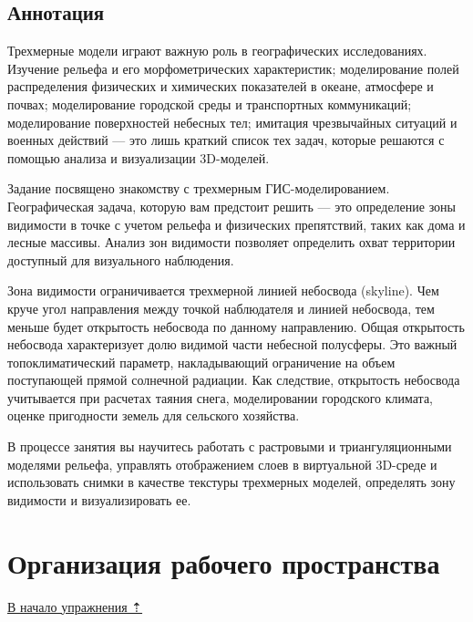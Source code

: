 \documentclass[]{book}
\theoremstyle{definition}
\theoremstyle{definition}
\theoremstyle{definition}
\theoremstyle{remark}
\begin{document}
\hypertarget{threed-modelling-annotation}{%
\subsection{Аннотация}\label{threed-modelling-annotation}}

Трехмерные модели играют важную роль в географических исследованиях.
Изучение рельефа и его морфометрических характеристик; моделирование
полей распределения физических и химических показателей в океане,
атмосфере и почвах; моделирование городской среды и транспортных
коммуникаций; моделирование поверхностей небесных тел; имитация
чрезвычайных ситуаций и военных действий --- это лишь краткий список тех
задач, которые решаются с помощью анализа и визуализации 3D-моделей.

Задание посвящено знакомству с трехмерным ГИС-моделированием.
Географическая задача, которую вам предстоит решить --- это определение
зоны видимости в точке с учетом рельефа и физических препятствий, таких
как дома и лесные массивы. Анализ зон видимости позволяет определить
охват территории доступный для визуального наблюдения.

Зона видимости ограничивается трехмерной линией небосвода (skyline). Чем
круче угол направления между точкой наблюдателя и линией небосвода, тем
меньше будет открытость небосвода по данному направлению. Общая
открытость небосвода характеризует долю видимой части небесной
полусферы. Это важный топоклиматический параметр, накладывающий
ограничение на объем поступающей прямой солнечной радиации. Как
следствие, открытость небосвода учитывается при расчетах таяния снега,
моделировании городского климата, оценке пригодности земель для
сельского хозяйства.

В процессе занятия вы научитесь работать с растровыми и
триангуляционными моделями рельефа, управлять отображением слоев в
виртуальной 3D-среде и использовать снимки в качестве текстуры
трехмерных моделей, определять зону видимости и визуализировать ее.

\hypertarget{threed-modelling-workspace}{%
\section{Организация рабочего
пространства}\label{threed-modelling-workspace}}

\protect\hyperlink{threed-modelling}{В начало упражнения ⇡}
\end{document}
